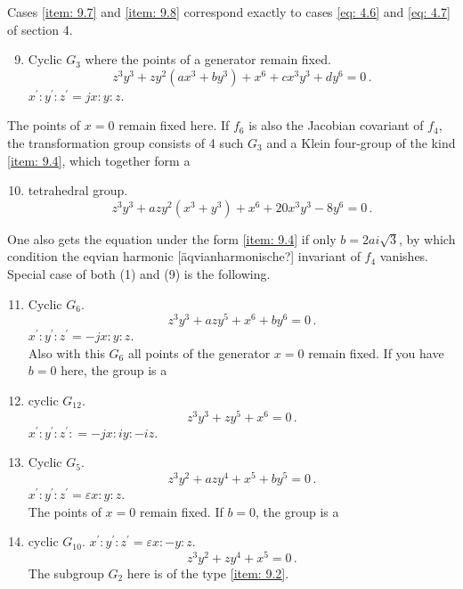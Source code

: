 \documentclass[leqno]{article}
\begin{document}
Cases \ref{item: 9.7} and \ref{item: 9.8} correspond exactly to cases \eqref{eq: 4.6} and \eqref{eq: 4.7} of section 4.
\begin{enumerate}[label=\arabic*)]
    \setcounter{enumi}{8}
    \item \label{item: 9.9}Cyclic $G_3$ where the points of a generator remain fixed.
    \begin{equation}\label{eq: 9.9}
        z^3 y^3 + z y^2 (ax^3 + by^3) + x^6 + c x^3 y^3 + d y^6 = 0 \, . \tag{9}
    \end{equation}
    $x^\prime : y^\prime : z^\prime = jx : y : z$. 
\end{enumerate}
The points of $x=0$ remain fixed here. If $f_6$ is also the Jacobian covariant of $f_4$, the transformation group consists of 4 such $G_3$ and a Klein four-group of the kind \ref{item: 9.4}, which together form a
\begin{enumerate}[label=\arabic*)]
    \setcounter{enumi}{9}
    \item \label{item: 9.10}tetrahedral group. 
    \begin{equation}\label{eq: 9.10}
        z^3 y^3 + a z y^2(x^3 + y^3) + x^6 + 20x^3 y^3-8y^6 = 0 \, . \tag{10}
    \end{equation}
\end{enumerate}
One also gets the equation under the form \ref{item: 9.4} if only $b=2ai\sqrt{3}$, by which condition the eqvian harmonic [\"aqvianharmonische?] invariant of $f_4$ vanishes. Special case of both (1) and (9) is the following.
\begin{enumerate}[label=\arabic*)]
    \setcounter{enumi}{10}
    \item \label{item: 9.11}Cyclic $G_6$.
    \begin{equation}\label{eq: 9.11}
        z^3 y^3 + a z y^5 + x^6 + b y^6 = 0 \, . \tag{11}
    \end{equation}
    $x^\prime : y^\prime : z^\prime = -jx : y: z$. \\
     Also with this $G_6$ all points of the generator $x=0$ remain fixed. If you have $b=0$ here, the group is a 
	\item cyclic $G_{12}$.
	\begin{equation}\label{eq: 9.12}
	z^3 y^3 + zy^5 + x^6 = 0 \, . \tag{12}
	\end{equation}
	$x^\prime : y^\prime : z^\prime: = -jx : iy : -iz$. 
	\item Cyclic $G_5$.
	\begin{equation}\label{eq: 9.13}
	z^3 y^2 + azy^4 + x^5 + by^5 = 0 \, . \tag{13}
	\end{equation}
	$x^\prime : y^\prime : z^\prime = \varepsilon x : y: z$. \\
	The points of $x=0$ remain fixed. If $b=0$, the group is a 
	\item cyclic $G_{10}$. $x^\prime : y^\prime : z^\prime = \varepsilon x : -y : z$. 
	\begin{equation}\label{eq: 9.14}
	z^3 y^2 + zy^4 + x^5 = 0 \, . \tag{14}
	\end{equation}
	The subgroup $G_2$ here is of the type \ref{item: 9.2}. 
\end{enumerate}
\end{document}
